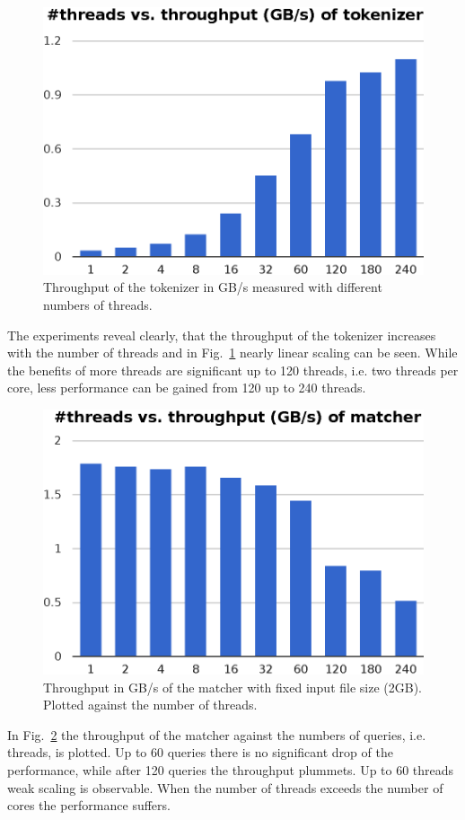 \begin{figure}\centering
  \includegraphics[scale=.66]{img/tokenizer_throughput.eps}
  \caption{Throughput of the tokenizer in GB/s measured with different numbers of threads.
  \label{tokenizer_throughput}}
\end{figure}
The experiments reveal clearly, that the throughput of the tokenizer increases with the number of threads and in Fig.~\ref{tokenizer_throughput} nearly linear scaling can be seen. While the benefits of more threads are significant up to 120 threads, i.e. two threads per core, less performance can be gained from 120 up to 240 threads.

\begin{figure}\centering
  \includegraphics[scale=.66]{img/matcher_throughput.eps}
  \caption{Throughput in GB/s of the matcher with fixed input file size (2GB). Plotted against the number of threads.\label{matcher_throughput}}
\end{figure}
In Fig.~\ref{matcher_throughput} the throughput of the matcher against the numbers of queries, i.e. threads, is plotted. Up to 60 queries there is no significant drop of the performance, while after 120 queries the throughput plummets. Up to 60 threads weak scaling is observable. When the number of threads exceeds the number of cores the performance suffers.

